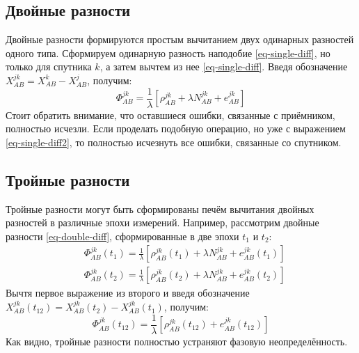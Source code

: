 \subsection*{\textbf{Двойные разности}}

Двойные разности формируются простым вычитанием двух одинарных разностей одного типа.
Сформируем одинарную разность наподобие \eqref{eq-single-diff}, но только для спутника $k$, а затем вычтем из нее \eqref{eq-single-diff}.
Введя обозначение $X_{AB}^{jk}=X_{AB}^k-X_{AB}^j$, получим:
\begin{equation}
\label{eq-double-diff}
\Phi_{AB}^{jk}=\frac{1}{\lambda}\left[\rho_{AB}^{jk}+\lambda N_{AB}^{jk}+e_{AB}^{jk}\right]    
\end{equation}
Стоит обратить внимание, что оставшиеся ошибки, связанные с приёмником, полностью исчезли.
Если проделать подобную операцию, но уже с выражением \eqref{eq-single-diff2}, то полностью исчезнуть все ошибки, связанные со спутником.

\subsection*{\textbf{Тройные разности}}

Тройные разности могут быть сформированы печём вычитания двойных разностей в различные эпохи измерений.
Например, рассмотрим двойные разности \eqref{eq-double-diff}, сформированные в две эпохи $t_1$ и $t_2$:
\begin{equation}
\begin{aligned}
&\Phi_{AB}^{jk}(t_1)=\frac{1}{\lambda}\left[\rho_{AB}^{jk}(t_1)+\lambda N_{AB}^{jk}+e_{AB}^{jk}(t_1)\right] \\
&\Phi_{AB}^{jk}(t_2)=\frac{1}{\lambda}\left[\rho_{AB}^{jk}(t_2)+\lambda N_{AB}^{jk}+e_{AB}^{jk}(t_2)\right] 
\end{aligned}
\end{equation}
Вычтя первое выражение из второго и введя обозначение $X_{AB}^{jk}(t_{12})=X_{AB}^{jk}(t_2)-X_{AB}^{jk}(t_1)$, получим:
\begin{equation}
\Phi_{AB}^{jk}(t_{12})=\frac{1}{\lambda}\left[\rho_{AB}^{jk}(t_{12})+e_{AB}^{jk}(t_{12})\right]    
\end{equation}
Как видно, тройные разности полностью устраняют фазовую неопределённость.